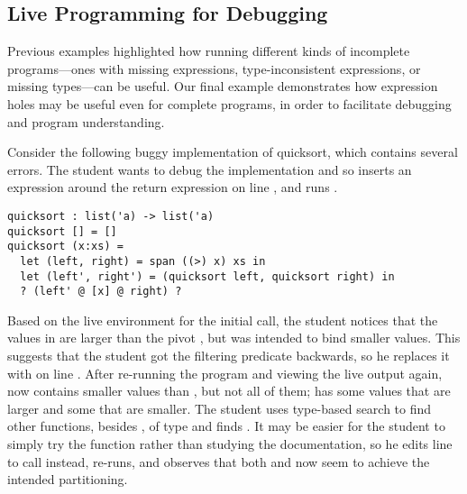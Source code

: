 \subsection{Live Programming for Debugging}

Previous examples highlighted how running different kinds of incomplete
programs---ones with missing expressions, type-inconsistent expressions, or
missing types---can be useful.
%
Our final example demonstrates how expression holes may be useful even for
complete programs, in order to facilitate debugging and program understanding.



Consider the following buggy implementation of quicksort, which contains several
errors.
%
The student wants to debug the implementation and so inserts an expression
around the return expression on line , and runs
.

\begin{lstlisting}
quicksort : list('a) -> list('a)
quicksort [] = []
quicksort (x:xs) =
  let (left, right) = span ((>) x) xs in
  let (left', right') = (quicksort left, quicksort right) in
  ? (left' @ [x] @ right) ?
\end{lstlisting}

\noindent
%
Based on the live environment for the initial call, the student notices that the
values in  are larger than the pivot , but  was intended
to bind smaller values.
%
This suggests that the student got the filtering predicate backwards, so he
replaces it with \li{(<)} on line .
%
After re-running the program and viewing the live output again,  now
contains smaller values than , but not all of them;  has some
values that are larger and some that are smaller.
%
The student uses type-based search to find other functions, besides ,
of type  and finds
.
%
It may be easier for the student to simply try the function rather than studying
the documentation, so he edits line  to call  instead,
re-runs, and observes that both  and  now seem to achieve the
intended partitioning.

